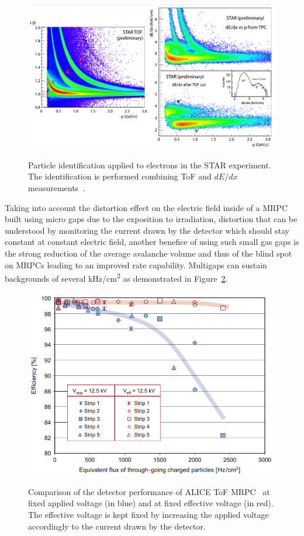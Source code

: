 	\begin{figure}[H]
		\centering
		\includegraphics[width = \plotwidth]{fig/chapt4/STAR-ToF.png}\\
		\caption{\label{fig:ParticleID} Particle identification applied to electrons in the STAR experiment. The identification is performed combining ToF and $dE/dx$ measurements~\cite{WILLIAMS2012}.}
	\end{figure}
	
	Taking into account the distortion effect on the electric field inside of a MRPC built using micro gaps due to the exposition to irradiation, distortion that can be understood by monitoring the current drawn by the detector which should stay constant at constant electric field, another benefice of using such small gas gaps is the strong reduction of the average avalanche volume and thus of the blind spot on MRPCs leading to an improved rate capability. Multigaps can sustain backgrounds of several \si{kHz/cm^2} as demonstrated in Figure~\ref{fig:MRPCRate}.
	
	\begin{figure}[H]
		\centering
		\includegraphics[width = 0.7\plotwidth]{fig/chapt4/ALICE-Rate_Capability.png}\\
		\caption{\label{fig:MRPCRate} Comparison of the detector performance of ALICE ToF MRPC~\cite{ALICI2007} at fixed applied voltage (in blue) and at fixed effective voltage (in red). The effective voltage is kept fixed by increasing the applied voltage accordingly to the current drawn by the detector.}
	\end{figure}
	
